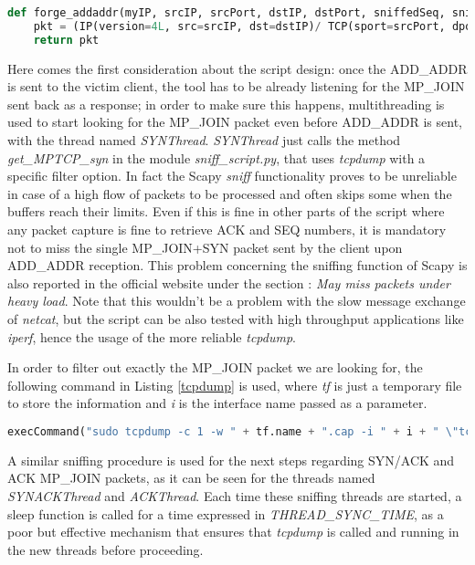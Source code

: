 \begin{lstlisting}[language=python, caption=\textit{forge\_addaddr method}, label=forgeaddaddrfunction] 
def forge_addaddr(myIP, srcIP, srcPort, dstIP, dstPort, sniffedSeq, sniffedAck):
    pkt = (IP(version=4L, src=srcIP, dst=dstIP)/ TCP(sport=srcPort, dport=dstPort, flags="A", seq=sniffedSeq, ack=sniffedAck, options=[TCPOption_MP(mptcp=MPTCP_AddAddr(address_id=ADDRESS_ID, adv_addr=myIP))]))
    return pkt
\end{lstlisting}

Here comes the first consideration about the script design: once the ADD\_ADDR is sent to the victim client, the tool has to be already listening for the MP\_JOIN sent back as a response; in order to make sure this happens, multithreading is used to start looking for the MP\_JOIN packet even before ADD\_ADDR is sent, with the thread named \textit{SYNThread}. \textit{SYNThread} just calls the method \textit{get\_MPTCP\_syn} in the module \textit{sniff\_script.py}, that uses \textit{tcpdump} with a specific filter option. In fact the Scapy \textit{sniff} functionality proves to be unreliable in case of a high flow of packets to be processed and often skips some when the buffers reach their limits. Even if this is fine in other parts of the script where any packet capture is fine to retrieve ACK and SEQ numbers, it is mandatory not to miss the single MP\_JOIN+SYN packet sent by the client upon ADD\_ADDR reception. This problem concerning the sniffing function of Scapy is also reported in the official website under the section : \textit{May miss packets under heavy load}.
Note that this wouldn't be a problem with the slow message exchange of \textit{netcat}, but the script can be also tested with high throughput applications like \textit{iperf}, hence the usage of the more reliable \textit{tcpdump}.

In order to filter out exactly the MP\_JOIN packet we are looking for, the following command in Listing \ref{tcpdump} is used, where \textit{tf} is just a temporary file to store the information and \textit{i} is the interface name passed as a parameter.

\begin{lstlisting}[language=python, caption=\textit{tcpdump for MP\_JOIN}, label=tcpdump]
execCommand("sudo tcpdump -c 1 -w " + tf.name + ".cap -i " + i + " \"tcp[tcpflags] & tcp-syn != 0\" 2>/dev/null", shell = True)
\end{lstlisting}

A similar sniffing procedure is used for the next steps regarding SYN/ACK and ACK MP\_JOIN packets, as it can be seen for the threads named \textit{SYNACKThread} and \textit{ACKThread}. Each time these sniffing threads are started, a sleep function is called for a time expressed in \textit{THREAD\_SYNC\_TIME}, as a poor but effective mechanism that ensures that \textit{tcpdump} is called and running in the new threads before proceeding.

